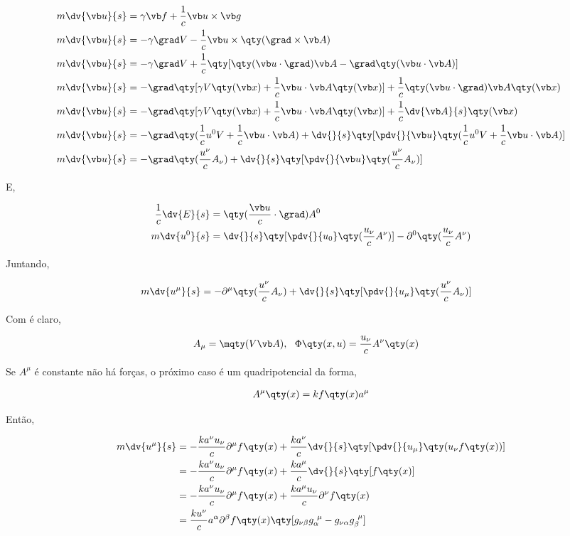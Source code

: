 \documentclass[twoside]{amsart}
\numberwithin{equation}{section}
\begin{document}
\begin{align}
    m\dv{\vb u}{s}&=\gamma\vb f+\frac1c\vb u\times\vb g\\
    m\dv{\vb u}{s}&=-\gamma\grad V-\frac1c\vb u\times\qty(\grad\times \vb A)\\
    m\dv{\vb u}{s}&=-\gamma\grad V+\frac1c\qty[\qty(\vb u\cdot\grad) \vb A-\grad\qty(\vb u\cdot \vb A)]\\
    m\dv{\vb u}{s}&=-\grad \qty[\gamma V\qty(\vb x)+\frac1c\vb u\cdot \vb A\qty(\vb x)]+\frac1c\qty(\vb u\cdot\grad) \vb A\qty(\vb x)\\
    m\dv{\vb u}{s}&=-\grad \qty[\gamma V\qty(\vb x)+\frac1c\vb u\cdot \vb A\qty(\vb x)]+\frac1c\dv{\vb A}{s}\qty(\vb x)\\
    m\dv{\vb u}{s}&=-\grad \qty(\frac1cu^0 V+\frac1c\vb u\cdot \vb A)+\dv{}{s}\qty[\pdv{}{\vb u}\qty(\frac1cu^0V+\frac1c\vb u\cdot \vb A)]\\
    m\dv{\vb u}{s}&=-\grad\qty( \frac{u^\nu}{c} A_\nu)+\dv{}{s}\qty[\pdv{}{\vb u}\qty(\frac{u^\nu}{c} A_\nu)]
\end{align}

E,

\begin{align}
    \frac1c\dv{E}{s}&=\qty(\frac{\vb u}{c}\cdot \grad)A^0\\
    m\dv{u^0}{s}&=\dv{}{s}\qty[\pdv{}{u_0}\qty(\frac{u_\nu}{c} A^\nu)]-\partial^0\qty(\frac{u_\nu}{c} A^\nu)
\end{align}

Juntando,

\begin{align}
    m\dv{u^\mu}{s}&=-\partial^\mu\qty(\frac{u^\nu}{c} A_\nu)+\dv{}{s}\qty[\pdv{}{u_\mu}\qty(\frac{u^\nu}{c} A_\nu)]
\end{align}

Com é claro,

\begin{align}
    A_\mu=\mqty( V&\vb A),\ \ \Phi\qty(x,u)=\frac{u_\nu}{c} A^\nu\qty(x)
\end{align}

Se $A^\mu$ é constante não há forças, o próximo caso é um quadripotencial da forma,

\begin{align}
    A^\mu\qty(x)=kf\qty(x)a^\mu
\end{align}

Então,

\begin{align}
    m\dv{u^\mu}{s}&=-\frac{ka^\nu u_\nu}{c}\partial^\mu f\qty(x)+\frac {ka^\nu}{c}\dv{}{s}\qty[\pdv{}{u_\mu}\qty(u_\nu f\qty(x))]\\
    &=-\frac{ka^\nu u_\nu}{c} \partial^\mu f\qty(x)+\frac {ka^\mu}{c}\dv{}{s}\qty[f\qty(x)]\\
    &=-\frac{ka^\nu u_\nu}{c} \partial^\mu f\qty(x)+\frac {ka^\mu u_\nu}{c}\partial^\nu f\qty(x)\\
    &=\frac{ku^\nu}{c}a^\alpha \partial^\beta f\qty(x)\qty[g_{\nu\beta}g_\alpha^{\ \mu}-g_{\nu\alpha}g_\beta^{\ \mu}]
\end{align}
\end{document}

